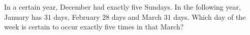 In a certain year, December had exactly five Sundays. In the following year, January has $31$ days, February $28$ days and March $31$ days. Which day of the week is certain to occur exactly five times in that March?
